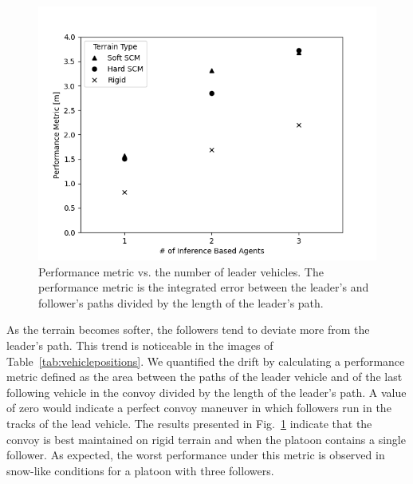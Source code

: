 \documentclass[12pt,twocolumn]{article}
\begin{document}
\begin{figure}
	\centering
	\includegraphics[width=1\columnwidth]{Figs/Demonstration/error_vs_agent.png}
	\caption{{\small Performance metric vs. the number of leader vehicles. The performance metric is the integrated error between the leader's and follower's paths divided by the length of the leader's path.}} 
	\label{fig:errorvsagent}
\end{figure}
As the terrain becomes softer, the followers tend to deviate more from the leader's path. This trend is noticeable in the images of Table~\ref{tab:vehiclepositions}. We quantified the drift by calculating a performance metric defined as the area between the paths of the leader vehicle and of the last following vehicle in the convoy divided by the length of the leader's path. A value of zero would indicate a perfect convoy maneuver in which followers run in the tracks of the lead vehicle. The results presented in Fig.~\ref{fig:errorvsagent} indicate that the convoy is best maintained on rigid terrain and when the platoon contains a single follower. As expected, the worst performance under this metric is observed in snow-like conditions for a platoon with three followers.
\end{document}
